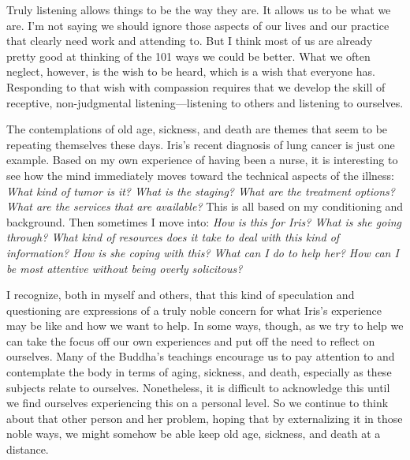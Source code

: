 Truly listening allows things to be the way they are. It allows us to 
be what we are. I'm not saying we should ignore those aspects of our 
lives and our practice that clearly need work and attending to. But I 
think most of us are already pretty good at thinking of the 101 ways we 
could be better. What we often neglect, however, is the wish to be 
heard, which is a wish that everyone has. Responding to that wish with 
compassion requires that we develop the skill of receptive, 
non-judgmental listening---listening to others and listening to 
ourselves.


The contemplations of old age, sickness, and death are themes that seem 
to be repeating themselves these days. Iris's recent diagnosis of lung 
cancer is just one example. Based on my own experience of having been a 
nurse, it is interesting to see how the mind immediately moves toward 
the technical aspects of the illness: \emph{What kind of tumor is it? 
What is the staging? What are the treatment options? What are the 
services that are available?} This is all based on my conditioning and 
background. Then sometimes I move into: \emph{How is this for Iris? 
What is she going through? What kind of resources does it take to deal 
with this kind of information? How is she coping with this? What can I 
do to help her? How can I be most attentive without being overly 
solicitous?}

I recognize, both in myself and others, that this kind of speculation 
and questioning are expressions of a truly noble concern for what 
Iris's experience may be like and how we want to help. In some ways, 
though, as we try to help we can take the focus off our own experiences 
and put off the need to reflect on ourselves. Many of the Buddha's 
teachings encourage us to pay attention to and contemplate the body in 
terms of aging, sickness, and death, especially as these subjects 
relate to ourselves. Nonetheless, it is difficult to acknowledge this 
until we find ourselves experiencing this on a personal level. So we 
continue to think about that other person and her problem, hoping that 
by externalizing it in those noble ways, we might somehow be able keep 
old age, sickness, and death at a distance.

